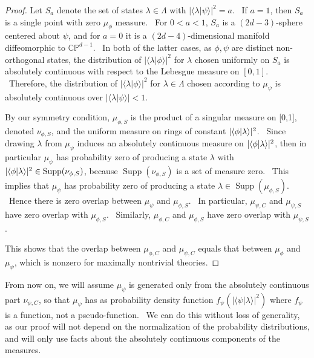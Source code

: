 \documentclass[letterpaper,12pt]{article}
\newcommand{\braket}[2]{\mbox{$ \langle #1 | #2 \rangle $}}
\DeclareMathOperator{\supp}{Supp}
\begin{document}
\begin{proof}
Let $S_a$ denote the set of states $\lambda\in\Lambda$ with $| \langle \lambda | \psi \rangle |^2 = a$. \ If $a=1$, then $S_a$ is a single point with zero $\mu_{\phi}$ measure. \ For $0 < a < 1$, $S_a$ is a $(2d-3)$-sphere centered about $\psi$, and for $a=0$ it is a $(2d-4)$-dimensional manifold diffeomorphic to $\mathbb{CP}^{d-1}$. \ In both of the latter cases, as $\phi,\psi$ are distinct non-orthogonal states, the distribution of $| \langle \lambda | \phi \rangle |^2$ for $\lambda$ chosen uniformly on $S_a$ is absolutely continuous with respect to the Lebesgue measure on $[0,1]$. \ Therefore, the distribution of $| \langle \lambda | \phi \rangle |^2$ for $\lambda\in\Lambda$ chosen according to $\mu_\psi$ is absolutely continuous over $| \langle \lambda | \psi \rangle | < 1$.

By our symmetry condition, $\mu_{\phi,S}$ is the product of a singular measure on [0,1], denoted $\nu_{\phi,S}$, and the uniform measure on rings of constant $|\braket{\phi}{\lambda}|^2$. \ Since drawing $\lambda$ from $\mu_\psi$ induces an absolutely continuous measure on $|\braket{\phi}{\lambda}|^2$, then in particular $\mu_\psi$ has probability zero of producing a state $\lambda$ with $|\braket{\phi}{\lambda}|^2 \in \supp(\nu_{\phi,S})$, because $\supp(\nu_{\phi,S})$ is a set of measure zero. \ This implies that $\mu_\psi$ has probability zero of producing a state $\lambda \in \supp(\mu_{\phi,S})$. \ Hence there is zero overlap between $\mu_\psi$ and $\mu_{\phi,S}$. \ In particular, $\mu_{\psi,C}$ and $\mu_{\psi,S}$ have zero overlap with $\mu_{\phi,S}$. \ Similarly, $\mu_{\phi,C}$ and $\mu_{\phi,S}$ have zero overlap with $\mu_{\psi,S}$.

This shows that the overlap between $\mu_{\phi,C}$ and $\mu_{\psi,C}$ equals that between $\mu_{\phi}$ and $\mu_{\psi}$, which is nonzero for maximally nontrivial theories.
\end{proof}


From now on, we will assume $\mu_\psi$ is generated only from the absolutely
continuous part $\nu_{\psi,C}$, so that $\mu_\psi$ has as probability
density function $f_{\psi}\left(| \langle \psi | \lambda \rangle %
|^2\right)$ where $f_\psi$ is a function, not a pseudo-function. \ We can do
this without loss of generality, as our proof will not depend on the
normalization of the probability distributions, and will only use facts
about the absolutely continuous components of the measures.
\end{document}

